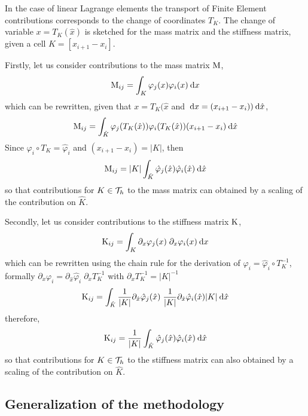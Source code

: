 In the case of linear Lagrange elements the transport of Finite Element contributions corresponds to the change of coordinates $T_K$. The change of variable $x = T_K(\hat{x})$ is sketched for the mass matrix and the stiffness matrix, given a cell $K = [x_{i+1}-x_{i}]$.

\medskip
Firstly, let us consider contributions to the mass matrix ${\mathrm M}$,
\begin{eqnarray*}
{\mathrm M}_{ij} = \int_{K} \varphi_j(x) \varphi_i(x) \hspace{.5ex}{\mathrm d} x
\end{eqnarray*}
which can be rewritten, given that $x = T_K(\hat{x}$ and $\hspace{.5ex}{\mathrm d} x = (x_{i+1}-x_{i})) \hspace{.5ex}{\mathrm d} \hat{x}$,
\begin{eqnarray*}
{\mathrm M}_{ij} = \int_{\hat{K}} \varphi_j(T_K(\hat{x})) \varphi_i(T_K(\hat{x})) (x_{i+1}-x_{i}) \hspace{.5ex}{\mathrm d} \hat{x}
\end{eqnarray*}
Since $\varphi_i\circ T_K = \hat\varphi_i$ and $(x_{i+1}-x_{i}) = |K|$, then
\begin{eqnarray*}
{\mathrm M}_{ij} = |K|\int_{\hat{K}} \hat\varphi_j(\hat{x}) \hat\varphi_i(\hat{x}) \hspace{.5ex}{\mathrm d} \hat{x}
\end{eqnarray*}
so that contributions for $K\in{\mathcal T}_h$ to the mass matrix can obtained by a scaling of the contribution on $\hat{K}$.

\medskip
Secondly, let us consider contributions to the stiffness matrix ${\mathrm K}$,
\begin{eqnarray*}
{\mathrm K}_{ij} = \int_{K} \partial_{x}\varphi_j(x)\;\partial_{x}\varphi_i(x) \hspace{.5ex}{\mathrm d} x
\end{eqnarray*}
which can be rewritten using the chain rule for the derivation of $\varphi_i = \hat\varphi_i \circ T_K^{-1}$, formally $\partial_x \varphi_i = \partial_{\hat{x}} \hat\varphi_i\;\partial_x T_K^{-1}$ with $\partial_x T_K^{-1} = |K|^{-1}$
\begin{eqnarray*}
{\mathrm K}_{ij} = \int_{\hat{K}} \frac{1}{|K|}\partial_{\hat{x}} \hat\varphi_j(\hat{x})\;\frac{1}{|K|}\partial_{\hat{x}} \hat\varphi_i(\hat{x}) |K| \hspace{.5ex}{\mathrm d} \hat{x}
\end{eqnarray*}
therefore,
\begin{eqnarray*}
{\mathrm K}_{ij} = \frac{1}{|K|}\int_{\hat{K}} \hat\varphi_j(\hat{x}) \hat\varphi_i(\hat{x}) \hspace{.5ex}{\mathrm d} \hat{x}
\end{eqnarray*}
so that contributions for $K\in{\mathcal T}_h$ to the stiffness matrix can also obtained by a scaling of the contribution on $\hat{K}$.

\subsection{Generalization of the methodology}

